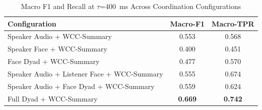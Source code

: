 \begin{table}[h]
\caption{Macro F1 and Recall at $\tau$=400~ms Across Coordination Configurations}
\label{tab:macro_coordination}
\small
\renewcommand{\arraystretch}{1.20}
\begin{tabular}{>{\raggedright\arraybackslash}p{4cm}cc}
\toprule
Configuration & Macro-F1 & Macro-TPR \\
\midrule
Speaker Audio + WCC-Summary & 0.553 & 0.568 \\
Speaker Face + WCC-Summary & 0.400 & 0.451 \\
Face Dyad + WCC-Summary & 0.477 & 0.570 \\
Speaker Audio + Listener Face + WCC-Summary & 0.555 & 0.674 \\
Speaker Audio + Face Dyad + WCC-Summary & 0.559 & 0.624 \\
Full Dyad + WCC-Summary & \textbf{0.669} & \textbf{0.742} \\
\bottomrule
\end{tabular}
\end{table}
